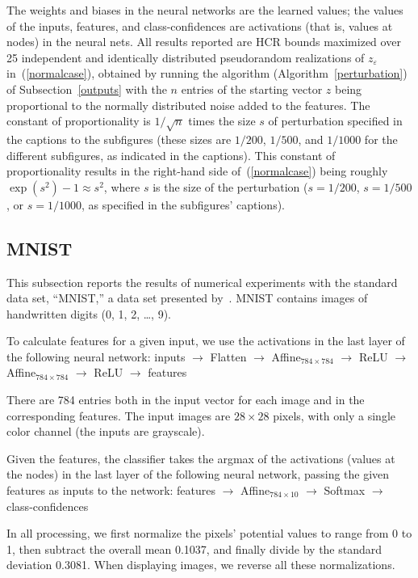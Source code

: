 \documentclass[]{fairmeta}
\renewcommand{\epsilon}{\varepsilon}
\begin{document}
The weights and biases in the neural networks are the learned values;
the values of the inputs, features, and class-confidences are activations
(that is, values at nodes) in the neural nets. All results reported
are HCR bounds maximized over 25 independent and identically distributed
pseudorandom realizations of $z_{\epsilon}$ in~(\ref{normalcase}),
obtained by running the algorithm (Algorithm~\ref{perturbation})
of Subsection~\ref{outputs} with the $n$ entries of the starting vector $z$
being proportional to the normally distributed noise added to the features.
The constant of proportionality is $1/\sqrt{n}$ times the size $s$
of perturbation specified in the captions to the subfigures
(these sizes are $1/200$, $1/500$, and $1/1000$ for the different subfigures,
as indicated in the captions).
This constant of proportionality results in the right-hand side
of~(\ref{normalcase}) being roughly $\exp(s^2) - 1 \approx s^2$,
where $s$ is the size of the perturbation
($s = 1/200$, $s = 1/500$, or $s = 1/1000$, as specified
in the subfigures' captions).


\subsection{MNIST}
\label{mnist}

This subsection reports the results of numerical experiments
with the standard data set, ``MNIST,''
a data set presented by~\cite{lecun-bottou-bengio-haffner}.
MNIST contains images of handwritten digits (0, 1, 2, \dots, 9).

To calculate features for a given input, we use the activations
in the last layer of the following neural network:
inputs $\rightarrow$
Flatten $\rightarrow$
Affine$_{784 \times 784}$ $\rightarrow$
ReLU $\rightarrow$
Affine$_{784 \times 784}$ $\rightarrow$
ReLU $\rightarrow$
features

There are 784 entries both in the input vector for each image
and in the corresponding features. The input images are $28 \times 28$ pixels,
with only a single color channel (the inputs are grayscale).

Given the features, the classifier takes the argmax of the activations
(values at the nodes) in the last layer of the following neural network,
passing the given features as inputs to the network:
features $\rightarrow$
Affine$_{784 \times 10}$ $\rightarrow$
Softmax $\rightarrow$
class-confidences

In all processing, we first normalize the pixels' potential values
to range from 0 to 1, then subtract the overall mean 0.1037, and finally divide
by the standard deviation 0.3081. When displaying images,
we reverse all these normalizations.
\end{document}
